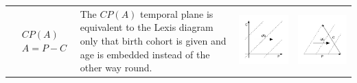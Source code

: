 \documentclass[
  12pt
]{scrartcl}
\begin{document}
\begin{center}
\begin{longtable}{m{}m{}m{}m{}}
  \midrule
  $$\begin{aligned}
    &CP(A) \\
    &A = P - C
  \end{aligned}$$ &
  The $CP(A)$ temporal plane is equivalent to the Lexis diagram only that birth cohort is given and age is embedded instead of the other way round. &
  \includegraphics[width = \linewidth]{../fig/CPa.pdf} &
  \includegraphics[width = \linewidth]{../fig/CPa_iso.pdf}  \\

\end{longtable}
\end{center}
\end{document}
